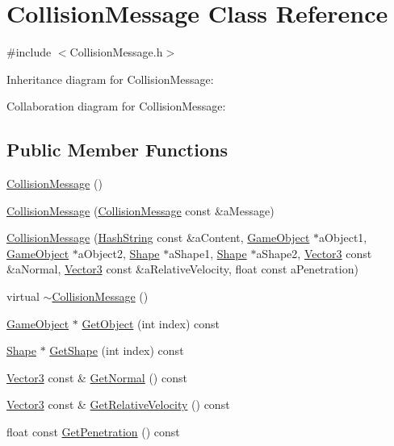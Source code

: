 \hypertarget{classCollisionMessage}{}\section{Collision\+Message Class Reference}
\label{classCollisionMessage}


{\ttfamily \#include $<$Collision\+Message.\+h$>$}



Inheritance diagram for Collision\+Message\+:


Collaboration diagram for Collision\+Message\+:
\subsection*{Public Member Functions}
\begin{DoxyCompactItemize}
\item 
\hyperlink{classCollisionMessage_abfa0423a36d516fbf86872e87f17c20b}{Collision\+Message} ()
\item 
\hyperlink{classCollisionMessage_a6ecc2bf03b275172789f819a9c98bd25}{Collision\+Message} (\hyperlink{classCollisionMessage}{Collision\+Message} const \&a\+Message)
\item 
\hyperlink{classCollisionMessage_aa8a20391e57b0b3af0ba2b48ca329e74}{Collision\+Message} (\hyperlink{classHashString}{Hash\+String} const \&a\+Content, \hyperlink{classGameObject}{Game\+Object} $\ast$a\+Object1, \hyperlink{classGameObject}{Game\+Object} $\ast$a\+Object2, \hyperlink{structShape}{Shape} $\ast$a\+Shape1, \hyperlink{structShape}{Shape} $\ast$a\+Shape2, \hyperlink{structVector3}{Vector3} const \&a\+Normal, \hyperlink{structVector3}{Vector3} const \&a\+Relative\+Velocity, float const a\+Penetration)
\item 
virtual \hyperlink{classCollisionMessage_a47fb43ae308de8eba656568be0fbccc8}{$\sim$\+Collision\+Message} ()
\item 
\hyperlink{classGameObject}{Game\+Object} $\ast$ \hyperlink{classCollisionMessage_a3a075d325c46a2b6769484511be0a95f}{Get\+Object} (int index) const 
\item 
\hyperlink{structShape}{Shape} $\ast$ \hyperlink{classCollisionMessage_a711eead88191d927d001c83121e9c4d9}{Get\+Shape} (int index) const 
\item 
\hyperlink{structVector3}{Vector3} const \& \hyperlink{classCollisionMessage_a58f0aaad60a94261e991550416e5a639}{Get\+Normal} () const 
\item 
\hyperlink{structVector3}{Vector3} const \& \hyperlink{classCollisionMessage_a50edffb94a926dee9e67faf2a014fd72}{Get\+Relative\+Velocity} () const 
\item 
float const \hyperlink{classCollisionMessage_a926e4ee177a0ea2b897bef005a40e91b}{Get\+Penetration} () const 
\end{DoxyCompactItemize}
